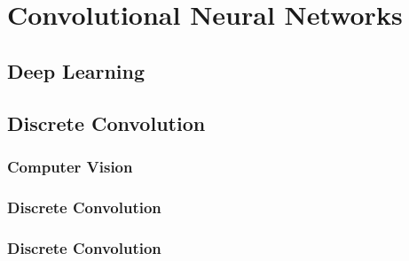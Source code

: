 \documentclass[aspectratio=169]{beamer}
\newcommand\imageright[1]{ %
    \caption*{\scalebox{.5}{\textcolor{lightgray}{\textcopyright~#1}}} %
}
\begin{document}
\section{Convolutional Neural Networks}
\label{sec:convolutional-neural-networks}

\subsection{Deep Learning}
\label{subsec:deep-learning}

\subsection{Discrete Convolution}
\label{subsec:discrete-convolution}

\begin{frame}
\frametitle{Computer Vision}
\end{frame}

\begin{frame}
\frametitle{Discrete Convolution}
\end{frame}

\begin{frame}
    \frametitle{Discrete Convolution}
    \begin{figure}
        \centering
        \imageright{Machine Learning Guru}
    \end{figure}
\end{frame}
\end{document}
